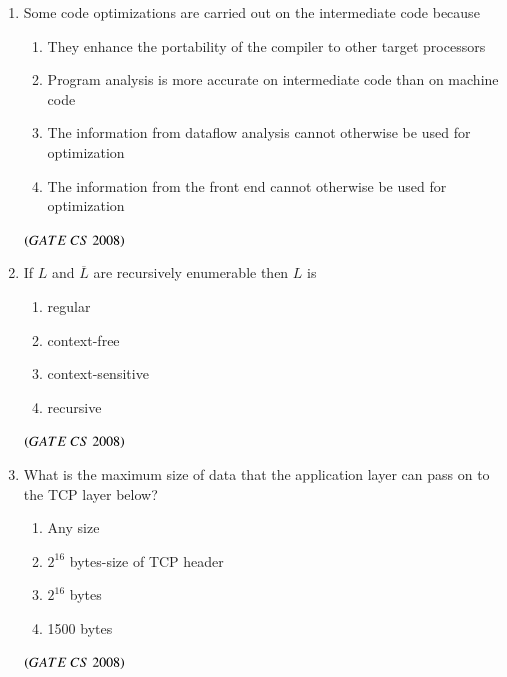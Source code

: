 \documentclass[journal, onecolumn]{IEEEtran}
\numberwithin{equation}{enumi}
\numberwithin{figure}{enumi}
\begin{document}
\begin{enumerate}
\item Some code optimizations are carried out on the intermediate code because 
   \begin{enumerate}
   \item They enhance the portability of the compiler to other target processors 
   \item Program analysis is more accurate on intermediate code than on machine code
   \item The information from dataflow analysis cannot otherwise be used for optimization
   \item The information from the front end cannot otherwise be used for optimization
\end{enumerate}
\hfill $\left(GATE\ CS\  2008\right)$
\bigskip

\item If $L$ and $\overline{L}$ are recursively enumerable then $L$ is
\vspace{-1em}%
\begin{multicols}{2}
\begin{enumerate}
    \item regular
    \item context-free 
    \item context-sensitive
    \item  recursive
\end{enumerate}
\end{multicols}
\hfill $\left(GATE\ CS\  2008\right)$

\item What is the maximum size of data that the application layer can pass on to the TCP layer below?
\vspace{-1em}%
\begin{multicols}{2}
\begin{enumerate}
   \item Any size
   \item $2^{16}$ bytes-size of TCP header 
   \item  $2^{16}$ bytes
   \item 1500 bytes 
\end{enumerate}
\end{multicols}
\hfill $\left(GATE\ CS\  2008\right)$


\end{enumerate}
\end{document}
